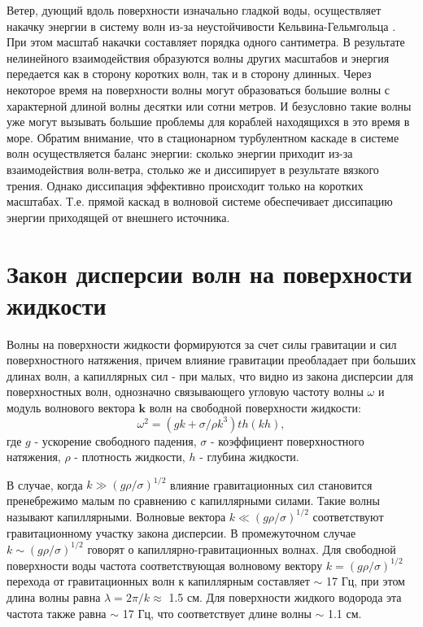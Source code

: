 Ветер, дующий вдоль поверхности изначально гладкой воды, осуществляет накачку энергии в систему волн из-за неустойчивости Кельвина-Гельмгольца \cite[c. 99]{NonLinearWaves}. При этом масштаб накачки составляет порядка одного сантиметра. В результате нелинейного взаимодействия образуются волны других масштабов и энергия передается как в сторону коротких волн, так и в сторону длинных. Через некоторое время на поверхности волны могут образоваться большие волны с характерной длиной волны десятки или сотни метров. И безусловно такие волны уже могут вызывать большие проблемы для кораблей находящихся в это время в море. 
	Обратим внимание, что в стационарном турбулентном каскаде в системе волн осуществляется баланс энергии: сколько энергии приходит из-за взаимодействия волн-ветра, столько же и диссипирует в результате вязкого трения. Однако диссипация эффективно происходит только на коротких масштабах. Т.е. прямой каскад в волновой системе обеспечивает диссипацию энергии приходящей от внешнего источника. %


\section{Закон дисперсии волн на поверхности жидкости}%

Волны на поверхности жидкости формируются за счет силы гравитации и сил поверхностного натяжения, причем влияние гравитации преобладает при больших длинах волн, а капиллярных сил - при малых, что видно из закона дисперсии для поверхностных волн, однозначно связывающего угловую частоту волны $\omega$ и модуль волнового вектора $\mathbf{k}$ волн на свободной поверхности жидкости:
\begin{equation}
 \label{eq:disper_dip}
\omega^2 = (gk + \sigma/\rho k^3)th(kh),
\end{equation}
где $g$ - ускорение свободного падения, $\sigma$ - коэффициент поверхностного натяжения, $\rho$ - плотность жидкости, $h$ - глубина жидкости.

В случае, когда $k \gg (g\rho/\sigma)^{1/2}$ влияние гравитационных сил становится пренебрежимо малым по сравнению 
с капиллярными силами. Такие волны называют капиллярными. Волновые вектора $k \ll (g\rho/\sigma)^{1/2}$ соответствуют гравитационному участку закона дисперсии. В промежуточном случае $k \sim (g\rho/\sigma)^{1/2}$ говорят о капиллярно-гравитационных волнах. Для свободной поверхности воды частота соответствующая волновому вектору $k = (g\rho/\sigma)^{1/2}$ перехода от гравитационных волн к капиллярным составляет $\sim$ 17 Гц, при этом длина волны равна $\lambda = 2\pi/k \approx$ 1.5 см. Для поверхности жидкого водорода эта частота также равна $\sim$ 17 Гц, что соответствует длине волны $\sim$ 1.1 см.


